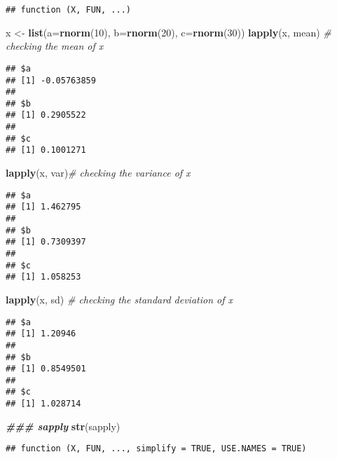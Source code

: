 \documentclass[
]{article}
\newenvironment{Shaded}{\begin{snugshade}}{\end{snugshade}}
\newcommand{\AttributeTok}[1]{\textcolor[rgb]{0.13,0.29,0.53}{#1}}
\newcommand{\CommentTok}[1]{\textcolor[rgb]{0.56,0.35,0.01}{\textit{#1}}}
\newcommand{\DecValTok}[1]{\textcolor[rgb]{0.00,0.00,0.81}{#1}}
\newcommand{\DocumentationTok}[1]{\textcolor[rgb]{0.56,0.35,0.01}{\textbf{\textit{#1}}}}
\newcommand{\FunctionTok}[1]{\textcolor[rgb]{0.13,0.29,0.53}{\textbf{#1}}}
\newcommand{\NormalTok}[1]{#1}
\newcommand{\OtherTok}[1]{\textcolor[rgb]{0.56,0.35,0.01}{#1}}
\begin{document}
\begin{verbatim}
## function (X, FUN, ...)
\end{verbatim}

\begin{Shaded}
\begin{Highlighting}[]
\NormalTok{x }\OtherTok{\textless{}{-}} \FunctionTok{list}\NormalTok{(}\AttributeTok{a=}\FunctionTok{rnorm}\NormalTok{(}\DecValTok{10}\NormalTok{), }\AttributeTok{b=}\FunctionTok{rnorm}\NormalTok{(}\DecValTok{20}\NormalTok{), }\AttributeTok{c=}\FunctionTok{rnorm}\NormalTok{(}\DecValTok{30}\NormalTok{))}
\FunctionTok{lapply}\NormalTok{(x, mean) }\CommentTok{\# checking the mean of x}
\end{Highlighting}
\end{Shaded}

\begin{verbatim}
## $a
## [1] -0.05763859
## 
## $b
## [1] 0.2905522
## 
## $c
## [1] 0.1001271
\end{verbatim}

\begin{Shaded}
\begin{Highlighting}[]
\FunctionTok{lapply}\NormalTok{(x, var)}\CommentTok{\# checking the variance of x}
\end{Highlighting}
\end{Shaded}

\begin{verbatim}
## $a
## [1] 1.462795
## 
## $b
## [1] 0.7309397
## 
## $c
## [1] 1.058253
\end{verbatim}

\begin{Shaded}
\begin{Highlighting}[]
\FunctionTok{lapply}\NormalTok{(x, sd) }\CommentTok{\# checking the standard deviation of x}
\end{Highlighting}
\end{Shaded}

\begin{verbatim}
## $a
## [1] 1.20946
## 
## $b
## [1] 0.8549501
## 
## $c
## [1] 1.028714
\end{verbatim}

\begin{Shaded}
\begin{Highlighting}[]
\DocumentationTok{\#\#\# sapply}
\FunctionTok{str}\NormalTok{(sapply)}
\end{Highlighting}
\end{Shaded}

\begin{verbatim}
## function (X, FUN, ..., simplify = TRUE, USE.NAMES = TRUE)
\end{verbatim}
\end{document}
